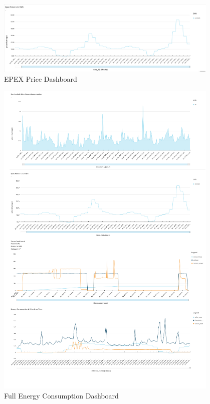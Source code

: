 \begin{figure}[H]
    \centering
    \includegraphics[width=0.95\textwidth]{fig/epex_Energyconsumption Dashboard.png}
    \caption{EPEX Price Dashboard}
\end{figure}

\begin{figure}[H]
    \centering
    \includegraphics[width=0.95\textwidth]{fig/fulldashboardnergyconsumption Dashboard.png}
    \caption{Full Energy Consumption Dashboard}
\end{figure}

